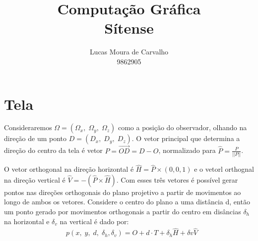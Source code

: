 \documentclass[12pt, a4paper]{article}
\title{Computação Gráfica\\ Sítense}
\author{Lucas Moura de Carvalho\\9862905}
\date{}
\begin{document}
\renewcommand*\contentsname{Sumário}

\maketitle
\newpage
\tableofcontents
\newpage


\section{Tela}

Consideraremos $\Omega = (\Omega_{x},\;\Omega_{y},\;\Omega_{z})$ como a posição do observador, olhando na direção de um ponto $D = (D_{x},\;D_{y},\;D_{z})$. O vetor principal que determina a direção do centro da tela é vetor $P = \overrightarrow{OD} = D-O$, normalizado para $\hat{P}=\frac{P}{||P||}$.

O vetor orthogonal na direção horizontal é $\hat{H} = \hat{P} \times (0,0,1)$ e o vetorl orthognal na direção vertical é $\hat{V} = -(\hat{P} \times \hat{H})$. Com esses três vetores é possível gerar pontos nas direções orthogonais do plano projetivo a partir de movimentos ao longo de ambos os vetores. Considere o centro do plano a uma distância d, então um ponto gerado por movimentos orthogonais a partir do centro em disâncias $\delta_{h}$ na horizontal e $\delta_{v}$ na vertical é dado por:
\begin{align*}
	& p(x,\;y,\;d,\;\delta_{h}, \delta_{v}) = O + d \cdot T + \delta_{h}\hat{H} + \delta{v}\hat{V}
\end{align*}
\end{document}
